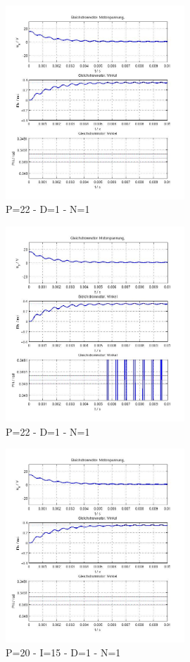 \begin{figure}[ht]
	\centering
	\includegraphics[width=0.6\textwidth]{PD-P22D1N1.jpg}
	\caption{P=22 - D=1 - N=1}
	\label{p22d1n1}
\end{figure}


\begin{figure}[ht]
	\centering
	\includegraphics[width=0.6\textwidth]{PD-P23D1N1.jpg}
	\caption{P=22 - D=1 - N=1}
	\label{p23d1n1}
\end{figure}


\begin{figure}[ht]
	\centering
	\includegraphics[width=0.6\textwidth]{PID-P20I15D1N1.jpg}
	\caption{P=20 - I=15 - D=1 - N=1}
	\label{p20i15d1n1}
\end{figure}


